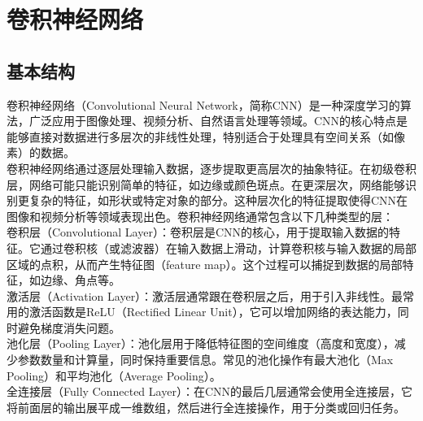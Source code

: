 \documentclass{NauThesis}
\begin{document}
\section{卷积神经网络}
\subsection{基本结构}
卷积神经网络（Convolutional Neural Network，简称CNN）是一种深度学习的算法，广泛应用于图像处理、视频分析、自然语言处理等领域。CNN的核心特点是能够直接对数据进行多层次的非线性处理，特别适合于处理具有空间关系（如像素）的数据。
\\\hspace*{2em}卷积神经网络通过逐层处理输入数据，逐步提取更高层次的抽象特征。在初级卷积层，网络可能只能识别简单的特征，如边缘或颜色斑点。在更深层次，网络能够识别更复杂的特征，如形状或特定对象的部分。这种层次化的特征提取使得CNN在图像和视频分析等领域表现出色。卷积神经网络通常包含以下几种类型的层：
\\\hspace*{2em}卷积层（Convolutional Layer）：卷积层是CNN的核心，用于提取输入数据的特征。它通过卷积核（或滤波器）在输入数据上滑动，计算卷积核与输入数据的局部区域的点积，从而产生特征图（feature map）。这个过程可以捕捉到数据的局部特征，如边缘、角点等。
\\\hspace*{2em}激活层（Activation Layer）：激活层通常跟在卷积层之后，用于引入非线性。最常用的激活函数是ReLU（Rectified Linear Unit），它可以增加网络的表达能力，同时避免梯度消失问题。
\\\hspace*{2em}池化层（Pooling Layer）：池化层用于降低特征图的空间维度（高度和宽度），减少参数数量和计算量，同时保持重要信息。常见的池化操作有最大池化（Max Pooling）和平均池化（Average Pooling）。
\\\hspace*{2em}全连接层（Fully Connected Layer）：在CNN的最后几层通常会使用全连接层，它将前面层的输出展平成一维数组，然后进行全连接操作，用于分类或回归任务。
\end{document}
